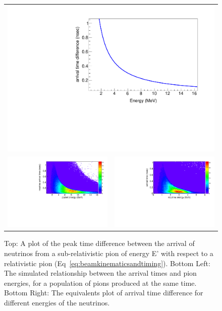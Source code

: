 \begin{figure}[t]
	\begin{center}
           	\begin{tabular}{c c}
 \\ \multicolumn{2}{c}{\includegraphics[width=0.5\linewidth]{Figures/2018.12.3_kinematics/deltaTvsE.pdf}} \\
 \includegraphics[width=0.49\linewidth]{Figures/2018.10.14_LBNFtiming/parentEvsdT.pdf} &
\includegraphics[width=0.49\linewidth]{Figures/2018.10.14_LBNFtiming/nuEvsdT.pdf} \\
			\end{tabular}
	\end{center}
	\caption{Top: A plot of the peak time difference between the arrival of neutrinos from a sub-relativistic pion of energy E' with respect to a relativistic pion (Eq~\ref{eq:beamkinematicsandtiming}). Bottom Left: The simulated relationship between the arrival times and pion energies, for a population of pions produced at the same time. Bottom Right: The equivalents plot of arrival time difference for different energies of the neutrinos.}
		\label{fig:beamkinematicsandtiming}
\end{figure}


